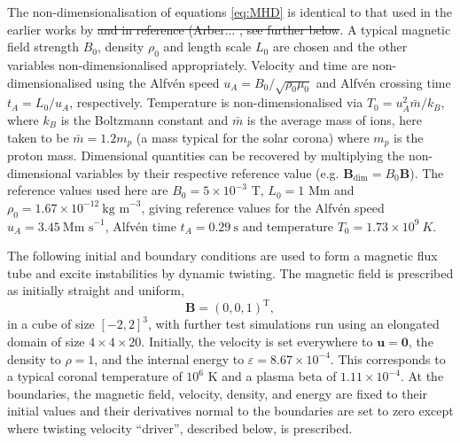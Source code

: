 \documentclass[fleqn,usenatbib]{mnras}
\newcommand{\rev}[1]{{\color{red} {#1}}}
\newcommand{\revcite}[1]{{\color{red} \underline{#1}}}
\renewcommand{\vec}[1]{{\bm #1}}
\begin{document}
The non-dimensionalisation of equations \eqref{eq:MHD} is identical to that
used in the earlier
works by \revcite{\citet{quinnEffectAnisotropicViscosity2020,quinnKelvinHelmholtzInstabilityCollapse2021}}
\rev{\sout{and in reference (Arber... , see further below}}.
A typical magnetic field strength $B_0$, density $\rho_0$ and length scale
$L_0$ are chosen and the other variables non-dimensionalised appropriately.
Velocity and time are non-dimensionalised using the Alfv\'en speed $u_A = B_0
/ \sqrt{\rho_0 \mu_0}$ and Alfv\'en crossing time $t_A = L_0/u_A$,
respectively. Temperature is non-dimensionalised via $T_0 = u_A^2 \bar{m}
/ k_B$, where $k_B$ is the Boltzmann constant and $\bar{m}$ is the average mass
of ions, here taken to be $\bar{m} = 1.2m_p$ (a mass typical for the solar
corona) where $m_p$ is the proton mass. Dimensional quantities can be recovered
by multiplying the non-dimensional variables by their respective reference
value (e.g. $\vec{B}_{\dim} = B_0 \vec{B}$). The reference values used here are
$B_0 = 5 \times 10^{-3}$ T, $L_0 = 1$ Mm and $\rho_0 = 1.67 \times 10^{-12}
\ \text{kg m}^{-3}$, giving reference values for the Alfv\'en speed $u_A
= 3.45\ \text{Mm s}^{-1}$, Alfv\'en time $t_A =
0.29\ \text{s}$ and temperature $T_0 = 1.73 \times 10^{9}\ K$.      

The following initial and boundary conditions are used to form a magnetic flux
tube and excite instabilities by dynamic twisting. The magnetic field is
prescribed as initially straight and uniform,
\begin{equation}
\vec{B} = (0, 0, 1)^{\text{T}},
\end{equation}
in a cube of size $[-2,2]^3$, with further test simulations run using an
elongated domain of size $4\times4\times20$. Initially, the velocity is set
everywhere to $\vec{u} = \vec{0}$, the density to $\rho = 1$, and the internal
energy to $\varepsilon = 8.67\times 10^{-4}$. This corresponds to a typical
coronal temperature of $10^6$ K and a plasma beta of $1.11 \times 10^{-4}$. At
the boundaries, the magnetic field, velocity, density, and energy are fixed to
their initial values and their derivatives normal to the boundaries are set to
zero  except where twisting velocity ``driver'', described below, is
prescribed.
\end{document}
